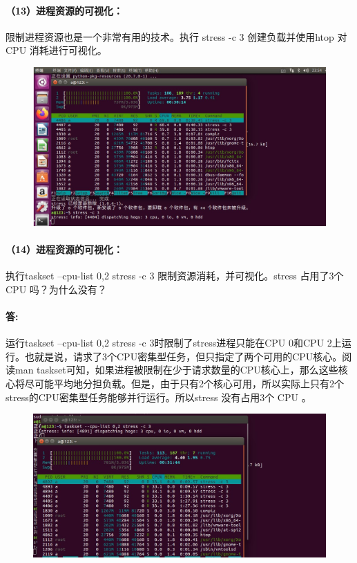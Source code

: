 \documentclass[a4paper, 12pt]{article}
\begin{document}
	\paragraph{（13）进程资源的可视化：}	
	限制进程资源也是一个非常有用的技术。执行 stress -c 3 创建负载并使用htop 对 CPU 消耗进行可视化。
	
	\begin{figure}[H]
		\centering
		\includegraphics[width=1\textwidth]{032.jpg}
	\end{figure}
	
	\paragraph{（14）进程资源的可视化：}
	执行taskset --cpu-list 0,2 stress -c 3 限制资源消耗，并可视化。stress 占用了3个 CPU 吗？为什么没有？
	
	\paragraph{答:}
	运行taskset --cpu-list 0,2 stress -c 3时限制了stress进程只能在CPU 0和CPU 2上运行。也就是说，请求了3个CPU密集型任务，但只指定了两个可用的CPU核心。阅读man taskset可知，如果进程被限制在少于请求数量的CPU核心上，那么这些核心将尽可能平均地分担负载。但是，由于只有2个核心可用，所以实际上只有2个stress的CPU密集型任务能够并行运行。所以stress 没有占用3个 CPU 。
	
	\begin{figure}[H]
		\centering
		\includegraphics[width=1\textwidth]{033.jpg}
	\end{figure}
	
\end{document}
